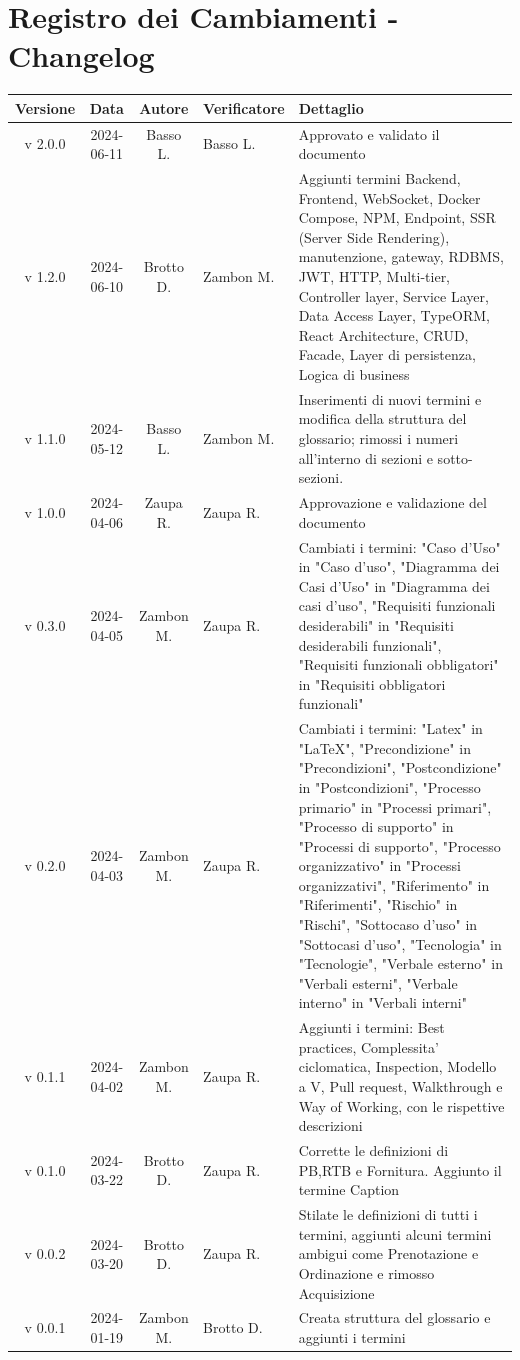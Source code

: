 \documentclass[12pt, oneside]{article}
\begin{document}
\section*{Registro dei Cambiamenti - Changelog}
\begin{longtable}{|c|c|c|p{3cm}|p{6cm}|}
\hline
\textbf{Versione} & \textbf{Data} & \textbf{Autore} & \textbf{Verificatore} & \textbf{Dettaglio} \\
\hline
v 2.0.0 & 2024-06-11 & Basso L. & Basso L. & Approvato e validato il documento\\
\hline
v 1.2.0 & 2024-06-10 & Brotto D. & Zambon M. & Aggiunti termini Backend, Frontend, WebSocket, Docker Compose, NPM, Endpoint, SSR (Server Side Rendering), manutenzione, gateway, RDBMS, JWT, HTTP, Multi-tier, Controller layer, Service Layer, Data Access Layer, TypeORM, React Architecture, CRUD, Facade, Layer di persistenza, Logica di business\\
\hline
v 1.1.0 & 2024-05-12 & Basso L. & Zambon M. & Inserimenti di nuovi termini e modifica della struttura del glossario; rimossi i numeri all'interno di sezioni e sotto-sezioni.\\
\hline
v 1.0.0 & 2024-04-06 & Zaupa R. & Zaupa R. & Approvazione e validazione del documento\\
\hline
v 0.3.0 & 2024-04-05 & Zambon M. & Zaupa R. & Cambiati i termini: "Caso d'Uso" in "Caso d'uso", "Diagramma dei Casi d'Uso" in "Diagramma dei casi d'uso", "Requisiti funzionali desiderabili" in "Requisiti desiderabili funzionali", "Requisiti funzionali obbligatori" in "Requisiti obbligatori funzionali"\\
\hline
v 0.2.0 & 2024-04-03 & Zambon M. & Zaupa R. & Cambiati i termini: "Latex" in "LaTeX", "Precondizione" in "Precondizioni", "Postcondizione" in "Postcondizioni", "Processo primario" in "Processi primari", "Processo di supporto" in "Processi di supporto", "Processo organizzativo" in "Processi organizzativi", "Riferimento" in "Riferimenti", "Rischio" in "Rischi", "Sottocaso d'uso" in "Sottocasi d'uso", "Tecnologia" in "Tecnologie", "Verbale esterno" in "Verbali esterni", "Verbale interno" in "Verbali interni"\\
\hline
v 0.1.1 & 2024-04-02 & Zambon M. & Zaupa R. & Aggiunti i termini: Best practices, Complessita' ciclomatica, Inspection, Modello a V, Pull request, Walkthrough e Way of Working, con le rispettive descrizioni\\
\hline
v 0.1.0 & 2024-03-22 & Brotto D. & Zaupa R. & Corrette le definizioni di PB,RTB e Fornitura. Aggiunto il termine Caption\\
\hline
v 0.0.2 & 2024-03-20 & Brotto D. & Zaupa R. & Stilate le definizioni di tutti i termini, aggiunti alcuni termini ambigui come Prenotazione e Ordinazione e rimosso Acquisizione \\
\hline
v 0.0.1 & 2024-01-19 & Zambon M. & Brotto D. & Creata struttura del glossario e aggiunti i termini \\
\hline
\end{longtable}
\newpage
\end{document}
